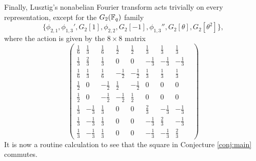 Finally, Lusztig's nonabelian Fourier transform acts trivially on every representation, except for the $G_2(\mathbb{F}_q)$ family 
$$\{\phi_{2,1},\phi_{1,3}',G_2[1],\phi_{2,2},G_2[-1],\phi_{1,3}'',G_2[\theta],G_2[\theta^2]\},$$
where the action is given by the $8\times 8$ matrix
\begin{equation*}
    \begin{pmatrix}
        \frac{1}{6} & \frac{1}{3} & \frac{1}{6} & \frac{1}{2} & \frac{1}{2} & \frac{1}{3} & \frac{1}{3} & \frac{1}{3} &\\
        \frac{1}{3} & \frac{2}{3} & \frac{1}{3} & 0 & 0 & -\frac{1}{3} & -\frac{1}{3} & -\frac{1}{3} \\
        \frac{1}{6} & \frac{1}{3} & \frac{1}{6} & -\frac{1}{2} & -\frac{1}{2} & \frac{1}{3} & \frac{1}{3} & \frac{1}{3} &\\
        \frac{1}{2} & 0 & -\frac{1}{2} & \frac{1}{2} & -\frac{1}{2} & 0 & 0 & 0\\
        \frac{1}{2} & 0 & -\frac{1}{2} & -\frac{1}{2} & \frac{1}{2} & 0 & 0 & 0\\
        \frac{1}{3} & -\frac{1}{3} & \frac{1}{3} & 0 & 0 & \frac{2}{3} & -\frac{1}{3} & -\frac{1}{3} \\
        \frac{1}{3} & -\frac{1}{3} & \frac{1}{3} & 0 & 0 & -\frac{1}{3} & \frac{2}{3} & -\frac{1}{3} \\
        \frac{1}{3} & -\frac{1}{3} & \frac{1}{3} & 0 & 0 & -\frac{1}{3} & -\frac{1}{3} & \frac{2}{3} 
    \end{pmatrix}
\end{equation*}
It is now a routine calculation to see that the square in Conjecture \ref{conj:main} commutes.